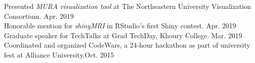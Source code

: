 \documentclass[a4paper]{article}
\newcommand{\mybullet}{
	\indent \textbullet \hspace*{2mm}
}
\begin{document}
    \mybullet Presented \textit{MURA visualization tool} at The Northeastern University 
    Visualization Consortium. \hfill Apr. 2019 \\
    \mybullet Honorable mention for \textit{shinyMRI} in RStudio's first Shiny contest. 
    \hfill Apr. 2019 \\
    \mybullet Graduate speaker for TechTalks at Grad TechDay, Khoury College. \hfill Mar. 2019 \\
		\mybullet Coordinated and organized CodeWars, a 24-hour hackathon as part of 
		university fest at Alliance University.\hfill Oct. 2015\\
		
\end{document}
